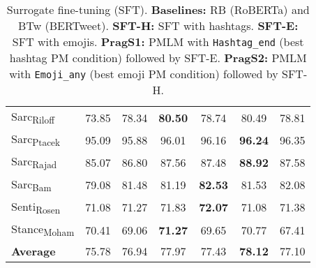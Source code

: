\begin{table}[h]
\begin{tabular}{lc:cc:cc|c}
Sarc\textsubscript{Riloff}  & 73.85                           & 78.34                           & \textbf{80.50} & 78.74                              & 80.49         &  78.81                     \\
Sarc\textsubscript{Ptacek}  & 95.09                           & 95.88                           & 96.01                           & 96.16                              & \textbf{96.24}    &  96.35  \\
Sarc\textsubscript{Rajad}   & 85.07                           & 86.80                           & 87.56                           & 87.48                              & \textbf{88.92}    &  87.58   \\
Sarc\textsubscript{Bam}     & 79.08                           & 81.48                           & 81.19                           & \textbf{82.53}    & 81.53          &  82.08                    \\
Senti\textsubscript{Rosen}  & 71.08                           & 71.27                           & 71.83                           & \textbf{72.07}    & 71.08         &   71.38                     \\
Stance\textsubscript{Moham} & 70.41                           & 69.06                           & \textbf{71.27} & 69.65                              & 70.77          & 67.41                    \\ 
\textbf{Average}      & 75.78                           & 76.94                           & 77.97                           & 77.43                              & \textbf{78.12}    &   77.10\\ \bottomrule
\end{tabular}
\caption{Surrogate fine-tuning (SFT). \textbf{Baselines:} RB (RoBERTa) and BTw (BERTweet). \textbf{SFT-H:} SFT with hashtags. \textbf{SFT-E:} SFT with emojis. \textbf{PragS1:} PMLM with \texttt{Hashtag\_end} (best hashtag PM condition) followed by SFT-E. \textbf{PragS2:} PMLM with \texttt{Emoji\_any} (best emoji PM condition) followed by SFT-H.  }\label{tab:sft_res}  %
\end{table}



